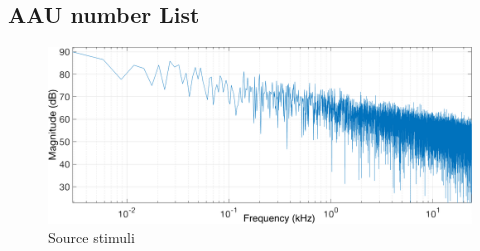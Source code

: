 \subsection{AAU number List}



\begin{figure}[H]
    \centering
    \includegraphics[width=1\textwidth]{Figures/pinknoise.png}
    \caption{Source stimuli}
    \label{fig:pinknoise}
\end{figure}
 